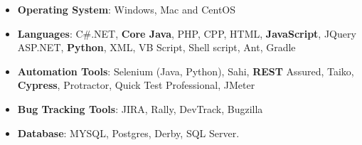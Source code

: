 \begin{cvparagraph}
\begin{itemize}
\item {\textbf{Operating System}: Windows, Mac and CentOS}
\item {\textbf{Languages}: C\#.NET, \textbf{Core Java}, PHP, CPP, HTML, \textbf{JavaScript}, JQuery ASP.NET, \textbf{Python}, XML, VB Script, Shell script, Ant, Gradle}
\item {\textbf{Automation  Tools}: Selenium (Java, Python), Sahi, \textbf{REST} Assured, Taiko, \textbf{Cypress}, Protractor, Quick Test Professional, JMeter}
\item {\textbf{Bug Tracking Tools}: JIRA, Rally, DevTrack, Bugzilla }
\item {\textbf{Database}: MYSQL, Postgres, Derby, SQL Server.}
\end{itemize}
\end{cvparagraph}